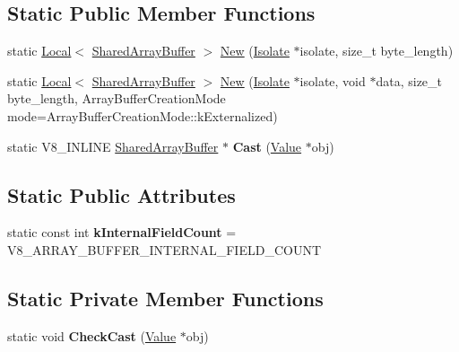 \subsection*{Static Public Member Functions}
\begin{DoxyCompactItemize}
\item 
static \hyperlink{classv8_1_1_local}{Local}$<$ \hyperlink{classv8_1_1_shared_array_buffer}{Shared\+Array\+Buffer} $>$ \hyperlink{classv8_1_1_shared_array_buffer_a0e7060cc31105c5bf780d770c1a7acc6}{New} (\hyperlink{classv8_1_1_isolate}{Isolate} $\ast$isolate, size\+\_\+t byte\+\_\+length)
\item 
static \hyperlink{classv8_1_1_local}{Local}$<$ \hyperlink{classv8_1_1_shared_array_buffer}{Shared\+Array\+Buffer} $>$ \hyperlink{classv8_1_1_shared_array_buffer_af708b1765380ad42b7d572dfc531c21c}{New} (\hyperlink{classv8_1_1_isolate}{Isolate} $\ast$isolate, void $\ast$data, size\+\_\+t byte\+\_\+length, Array\+Buffer\+Creation\+Mode mode=Array\+Buffer\+Creation\+Mode\+::k\+Externalized)
\item 
static V8\+\_\+\+I\+N\+L\+I\+NE \hyperlink{classv8_1_1_shared_array_buffer}{Shared\+Array\+Buffer} $\ast$ {\bfseries Cast} (\hyperlink{classv8_1_1_value}{Value} $\ast$obj)\hypertarget{classv8_1_1_shared_array_buffer_ac4e1ba5d4564c7033814f4cc45fdda84}{}\label{classv8_1_1_shared_array_buffer_ac4e1ba5d4564c7033814f4cc45fdda84}

\end{DoxyCompactItemize}
\subsection*{Static Public Attributes}
\begin{DoxyCompactItemize}
\item 
static const int {\bfseries k\+Internal\+Field\+Count} = V8\+\_\+\+A\+R\+R\+A\+Y\+\_\+\+B\+U\+F\+F\+E\+R\+\_\+\+I\+N\+T\+E\+R\+N\+A\+L\+\_\+\+F\+I\+E\+L\+D\+\_\+\+C\+O\+U\+NT\hypertarget{classv8_1_1_shared_array_buffer_a6f47f6b441e37aefd1a9d0176e8a3da8}{}\label{classv8_1_1_shared_array_buffer_a6f47f6b441e37aefd1a9d0176e8a3da8}

\end{DoxyCompactItemize}
\subsection*{Static Private Member Functions}
\begin{DoxyCompactItemize}
\item 
static void {\bfseries Check\+Cast} (\hyperlink{classv8_1_1_value}{Value} $\ast$obj)\hypertarget{classv8_1_1_shared_array_buffer_abd9ac57bccf0e1a99b24057332a743d9}{}\label{classv8_1_1_shared_array_buffer_abd9ac57bccf0e1a99b24057332a743d9}

\end{DoxyCompactItemize}


